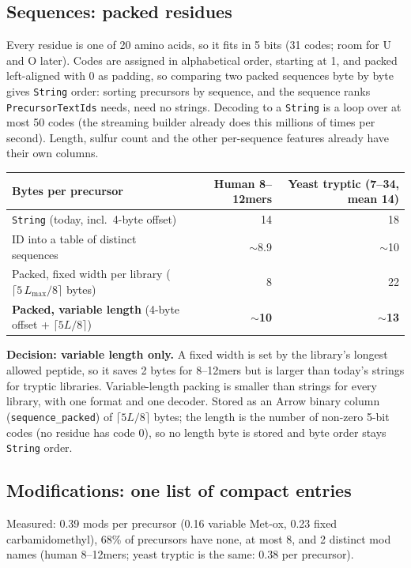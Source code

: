 \documentclass[10pt]{article}
\newcommand{\code}[1]{\texttt{#1}}
\begin{document}
\subsection*{Sequences: packed residues}
Every residue is one of 20 amino acids, so it fits in 5 bits (31 codes; room for U and O later). Codes are assigned in
alphabetical order, starting at 1, and packed left-aligned with 0 as padding, so comparing two packed sequences byte by
byte gives \code{String} order: sorting precursors by sequence, and the sequence ranks \code{PrecursorTextIds} needs,
need no strings. Decoding to a \code{String} is a loop over at most 50 codes (the streaming builder already does this
millions of times per second). Length, sulfur count and the other per-sequence features already have their own columns.

\begin{center}\small
\begin{tabular}{l r r}
\toprule
Bytes per precursor & Human 8--12mers & Yeast tryptic (7--34, mean 14) \\
\midrule
\code{String} (today, incl.\ 4-byte offset) & 14 & 18 \\
ID into a table of distinct sequences & $\sim$8.9 & $\sim$10 \\
Packed, fixed width per library ($\lceil 5\,L_{\max}/8\rceil$ bytes) & 8 & 22 \\
\textbf{Packed, variable length} (4-byte offset + $\lceil 5L/8\rceil$) & \textbf{$\sim$10} & \textbf{$\sim$13} \\
\bottomrule
\end{tabular}
\end{center}

\textbf{Decision: variable length only.} A fixed width is set by the library's longest allowed peptide, so it saves
2 bytes for 8--12mers but is larger than today's strings for tryptic libraries. Variable-length packing is smaller than
strings for every library, with one format and one decoder. Stored as an Arrow binary column (\code{sequence\_packed}) of
$\lceil 5L/8\rceil$ bytes; the length is the number of non-zero 5-bit codes (no residue has code 0), so no length byte is
stored and byte order stays \code{String} order.

\subsection*{Modifications: one list of compact entries}
Measured: 0.39 mods per precursor (0.16 variable Met-ox, 0.23 fixed carbamidomethyl), 68\% of precursors have none, at
most 8, and 2 distinct mod names (human 8--12mers; yeast tryptic is the same: 0.38 per precursor).
\end{document}
